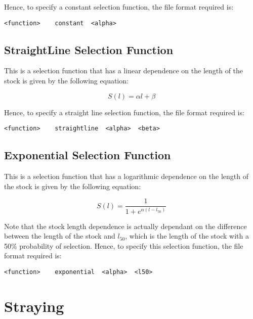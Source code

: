 \documentclass[]{book}
\begin{document}
Hence, to specify a constant selection function, the file format
required is:

\begin{verbatim}
<function>    constant  <alpha>
\end{verbatim}

\hypertarget{straightline-selection-function}{%
\subsection{StraightLine Selection Function}\label{straightline-selection-function}}

This is a selection function that has a linear dependence on the length
of the stock is given by the following equation:

\begin{equation}
\label{eq:straightsel}
S(l) = \alpha l + \beta\end{equation}

Hence, to specify a straight line selection function, the file format
required is:

\begin{verbatim}
<function>    straightline  <alpha>  <beta>
\end{verbatim}

\hypertarget{exponential-selection-function}{%
\subsection{Exponential Selection Function}\label{exponential-selection-function}}

This is a selection function that has a logarithmic dependence on the
length of the stock is given by the following equation:

\begin{equation}
\label{eq:expsel}
S(l) = \frac{1}{1 + e^{ \alpha (l - l_{50})}}\end{equation}

Note that the stock length dependence is actually dependant on the
difference between the length of the stock and \(l_{50}\), which is the
length of the stock with a 50\% probability of selection. Hence, to
specify this selection function, the file format required is:

\begin{verbatim}
<function>    exponential  <alpha>  <l50>
\end{verbatim}

\hypertarget{sec:stockstray}{%
\section{Straying}\label{sec:stockstray}}
\end{document}
